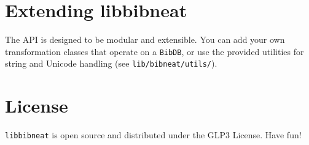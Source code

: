 \documentclass[11pt]{article}
\begin{document}
\section{Extending libbibneat}
The API is designed to be modular and extensible. You can add your own transformation classes that operate on a \texttt{BibDB}, or use the provided utilities for string and Unicode handling (see \texttt{lib/bibneat/utils/}).

\section{License}
\texttt{libbibneat} is open source and distributed under the GLP3 License. Have fun!
\end{document}
